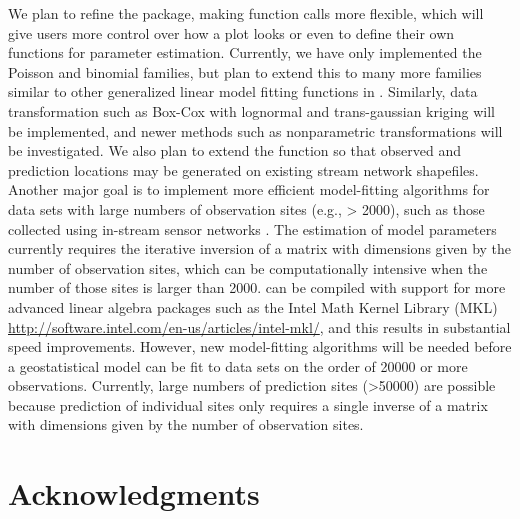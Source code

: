 \documentclass[nojss]{jss}
\begin{document}
We plan to refine the  package, making function calls more flexible, which will give users more control over how a plot looks or even to define their own functions for parameter estimation.  Currently, we have only implemented the Poisson and binomial families, but plan to extend this to many more families similar to other generalized linear model fitting functions in .  Similarly, data transformation such as Box-Cox \citep{Box:Cox:anal:1964} with lognormal and trans-gaussian kriging \citep[][p. 135-138]{Cres:stat:1993} will be implemented, and newer methods such as nonparametric transformations \citep{Grib:Kriv:new:2012} will be investigated. We also plan to extend the  function so that observed and prediction locations may be generated on existing stream network shapefiles. Another major goal is to implement more efficient model-fitting algorithms for data sets with large numbers of observation sites (e.g., > 2000), such as those collected using in-stream sensor networks \citep{Port:Hans:Lin:stay:2012}. The estimation of model parameters currently requires the iterative inversion of a matrix with dimensions given by the number of observation sites, which can be computationally intensive when the number of those sites is larger than 2000.  can be compiled with support for more advanced linear algebra packages such as the Intel Math Kernel Library (MKL) \url{http://software.intel.com/en-us/articles/intel-mkl/}, and this results in substantial speed improvements.  However, new model-fitting algorithms will be needed before a geostatistical model can be fit to data sets on the order of 20000 or more observations. Currently, large numbers of prediction sites (>50000) are possible because prediction of individual sites only requires a single inverse of a matrix with dimensions given by the number of observation sites. 


%
%

\section{Acknowledgments}
\end{document}
